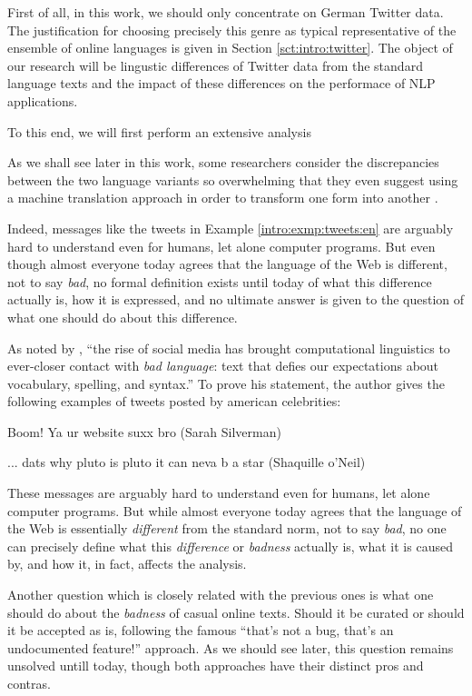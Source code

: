 First of all, in this work, we should only concentrate on German Twitter data.
The justification for choosing precisely this genre as typical representative
of the ensemble of online languages is given in Section
\ref{sct:intro:twitter}.  The object of our research will be lingustic
differences of Twitter data from the standard language texts and the impact of
these differences on the performace of NLP applications.

To this end, we will first perform an extensive analysis

As we shall see later in this work, some researchers consider the
discrepancies between the two language variants so overwhelming that they even
suggest using a machine translation approach in order to transform one form
into another \citep[cf.][]{Aw:06,Pennell:11}.

Indeed, messages like the tweets in Example \ref{intro:exmp:tweets:en} are
arguably hard to understand even for humans, let alone computer programs.
But even though almost everyone today agrees that the language of the Web is
different, not to say \emph{bad}, no formal definition exists until today of
what this difference actually is, how it is expressed, and no ultimate answer
is given to the question of what one should do about this difference.


As noted by \cite{Eisenstein:13}, ``the rise of social media has brought
computational linguistics to ever-closer contact with \emph{bad language}:
text that defies our expectations about vocabulary, spelling, and syntax.''
To prove his statement, the author gives the following examples of tweets
posted by american celebrities:

\begin{example}
Boom! Ya ur website suxx bro {\upshape (Sarah Silverman)}

... dats why pluto is pluto it can neva b a star {\upshape (Shaquille o'Neil)}
\end{example}
These messages are arguably hard to understand even for humans, let alone
computer programs.  But while almost everyone today agrees that the language
of the Web is essentially \emph{different} from the standard norm, not to say
\emph{bad}, no one can precisely define what this \emph{difference} or
\emph{badness} actually is, what it is caused by, and how it, in fact, affects
the analysis.


Another question which is closely related with the previous ones is what one
should do about the \emph{badness} of casual online texts.  Should it be
curated or should it be accepted as is, following the famous ``that's not a
bug, that's an undocumented feature!'' approach.  As we should see later, this
question remains unsolved untill today, though both approaches have their
distinct pros and contras.
